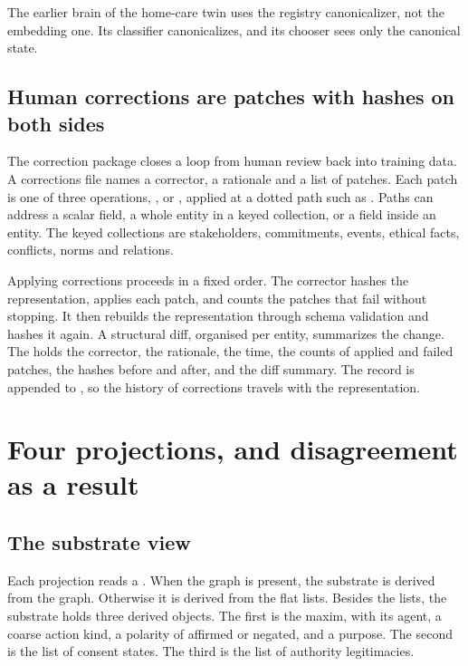 The earlier brain of the home-care twin uses the registry canonicalizer, not the embedding one.
Its classifier canonicalizes, and its chooser sees only the canonical state.

\subsection{Human corrections are patches with hashes on both sides}

The correction package closes a loop from human review back into training data. A corrections
file names a corrector, a rationale and a list of patches. Each patch is one of three operations,
,  or , applied at a dotted path such as
. Paths can address a scalar field, a whole entity in a keyed
collection, or a field inside an entity. The keyed collections are stakeholders, commitments,
events, ethical facts, conflicts, norms and relations.

Applying corrections proceeds in a fixed order. The corrector hashes the representation, applies
each patch, and counts the patches that fail without stopping. It then rebuilds the
representation through schema validation and hashes it again. A structural diff, organised per
entity, summarizes the change. The  holds the corrector, the rationale, the
time, the counts of applied and failed patches, the hashes before and after, and the diff summary.
The record is appended to , so the history of corrections travels
with the representation.

\section{Four projections, and disagreement as a result}\label{sec:compiler-projections}

\subsection{The substrate view}

Each projection reads a . When the graph is present, the substrate is
derived from the graph. Otherwise it is derived from the flat lists. Besides the lists, the
substrate holds three derived objects. The first is the maxim, with its agent, a coarse action
kind, a polarity of affirmed or negated, and a purpose. The second is the list of consent states.
The third is the list of authority legitimacies.

